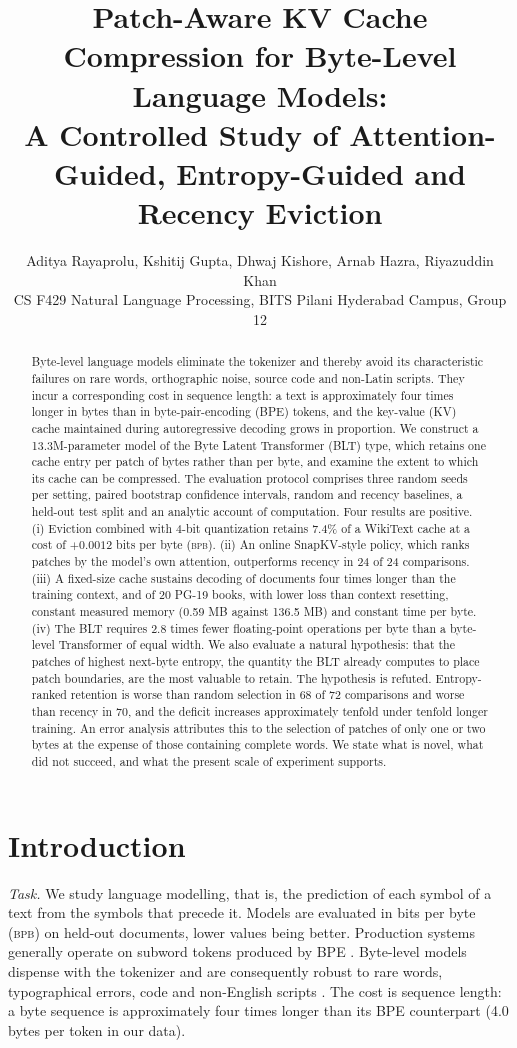 \documentclass[10pt,twocolumn]{extarticle}
\title{Patch-Aware KV Cache Compression for Byte-Level Language Models:\\A Controlled Study of Attention-Guided, Entropy-Guided and Recency Eviction}
\author{\small Aditya Rayaprolu, Kshitij Gupta, Dhwaj Kishore, Arnab Hazra, Riyazuddin Khan\\[2pt]\small CS F429 Natural Language Processing, BITS Pilani Hyderabad Campus, Group 12}
\date{}
\newcommand{\bpb}{\textsc{bpb}}
\begin{document}
\normalsize
\maketitle

\begin{abstract}
Byte-level language models eliminate the tokenizer and thereby avoid its characteristic failures on rare words, orthographic noise, source code and non-Latin scripts. They incur a corresponding cost in sequence length: a text is approximately four times longer in bytes than in byte-pair-encoding (BPE) tokens, and the key-value (KV) cache maintained during autoregressive decoding grows in proportion. We construct a 13.3M-parameter model of the Byte Latent Transformer (BLT) type, which retains one cache entry per patch of bytes rather than per byte, and examine the extent to which its cache can be compressed. The evaluation protocol comprises three random seeds per setting, paired bootstrap confidence intervals, random and recency baselines, a held-out test split and an analytic account of computation. Four results are positive. (i) Eviction combined with 4-bit quantization retains 7.4\% of a WikiText cache at a cost of $+0.0012$ bits per byte (\bpb). (ii) An online SnapKV-style policy, which ranks patches by the model's own attention, outperforms recency in 24 of 24 comparisons. (iii) A fixed-size cache sustains decoding of documents four times longer than the training context, and of 20 PG-19 books, with lower loss than context resetting, constant measured memory (0.59 MB against 136.5 MB) and constant time per byte. (iv) The BLT requires 2.8 times fewer floating-point operations per byte than a byte-level Transformer of equal width. We also evaluate a natural hypothesis: that the patches of highest next-byte entropy, the quantity the BLT already computes to place patch boundaries, are the most valuable to retain. The hypothesis is refuted. Entropy-ranked retention is worse than random selection in 68 of 72 comparisons and worse than recency in 70, and the deficit increases approximately tenfold under tenfold longer training. An error analysis attributes this to the selection of patches of only one or two bytes at the expense of those containing complete words. We state what is novel, what did not succeed, and what the present scale of experiment supports.
\end{abstract}

\section{Introduction}
\textit{Task.} We study language modelling, that is, the prediction of each symbol of a text from the symbols that precede it. Models are evaluated in bits per byte (\bpb) on held-out documents, lower values being better. Production systems generally operate on subword tokens produced by BPE \citep{sennrich2016bpe}. Byte-level models dispense with the tokenizer and are consequently robust to rare words, typographical errors, code and non-English scripts \citep{xue2022byt5,yu2023megabyte,slagle2024spacebyte,pagnoni2024blt}. The cost is sequence length: a byte sequence is approximately four times longer than its BPE counterpart (4.0 bytes per token in our data).
\end{document}
